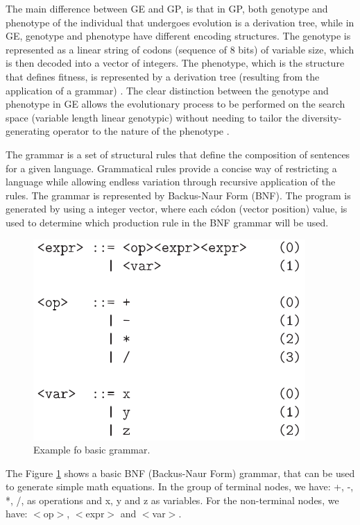\documentclass[journal]{IEEEtran}
\begin{document}
The main difference between GE and GP, is that in GP, both genotype and phenotype of the individual that undergoes evolution is a derivation tree, while in GE, genotype and phenotype have different encoding structures. The genotype is represented as a linear string of codons (sequence of 8 bits) of variable size, which is then decoded into a vector of integers. The phenotype, which is the structure that defines fitness, is represented by a derivation tree (resulting from the application of a grammar) \cite{cerri2013grammatical}. The clear distinction between the genotype and phenotype in GE allows the evolutionary process to be performed on the search space (variable length linear genotypic) without needing to tailor the diversity-generating operator to the nature of the phenotype \cite{sabar2013grammatical}.

The grammar is a set of structural rules that define the composition of sentences for a given language. Grammatical rules provide a concise way of restricting a language while allowing endless variation through recursive application of the rules\cite{byrne2015optimising}. The grammar is represented by Backus-Naur Form (BNF). The program is generated by using a integer vector, where each códon (vector position) value, is used to determine which production rule in the BNF grammar will be used.

\begin{figure}[!htb]
	\centering
	\includegraphics[scale=.6]{figures/grammar.png}
	\caption{Example fo basic grammar. \cite{ryan1998grammatical}}
	\label{fig:grammar}
\end{figure}

The Figure \ref{fig:grammar} shows a basic BNF (Backus-Naur Form) grammar, that can be used to generate simple math equations. In the group of terminal nodes, we have: +, -, *, /, as operations and x, y and z as variables. For the non-terminal nodes, we have: $<$op$>$, $<$expr$>$ and $<$var$>$.
\end{document}

